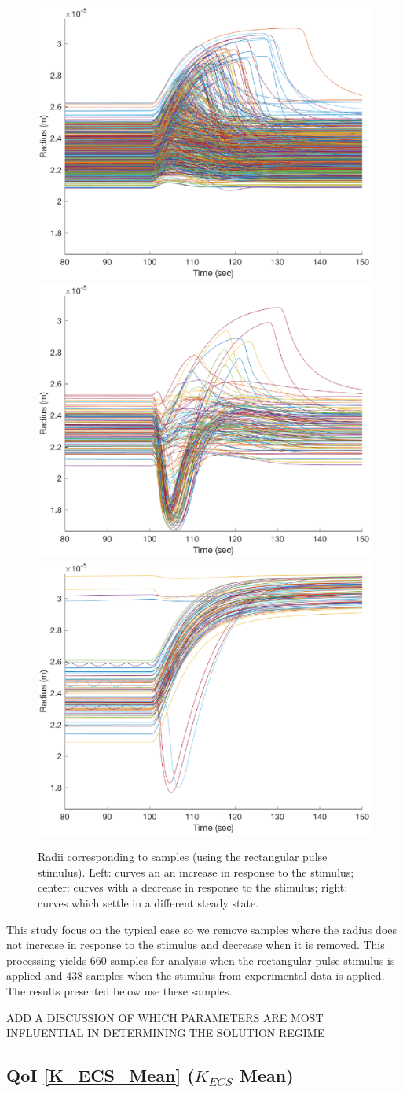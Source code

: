 \documentclass[12pt]{article}
\numberwithin{equation}{section}
\begin{document}
\begin{figure}[h]
\centering
\includegraphics[width=.3 \textwidth]{Figures/Increase_with_Stim_Curves.eps}
\includegraphics[width=.3 \textwidth]{Figures/Decrease_with_Stim_Curves.eps}
\includegraphics[width=.3 \textwidth]{Figures/Higher_Steady_State.eps}
\caption{Radii corresponding to samples (using the rectangular pulse stimulus). Left: curves an an increase in response to the stimulus; center: curves with a decrease in response to the stimulus; right: curves which settle in a different steady state.}
\label{solution_regimes}
\vspace{-.5 cm}
\end{figure}

This study focus on the typical case so we remove samples where the radius does not increase in response to the stimulus and decrease when it is removed. This processing yields 660 samples for analysis when the rectangular pulse stimulus is applied and 438 samples when the stimulus from experimental data is applied. The results presented below use these samples.

ADD A DISCUSSION OF WHICH PARAMETERS ARE MOST INFLUENTIAL IN DETERMINING THE SOLUTION REGIME


\newpage
\subsection{QoI \eqref{K_ECS_Mean} ($K_{ECS}$ Mean)}
\end{document}
